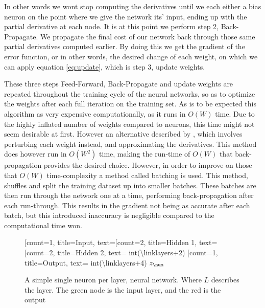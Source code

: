 In other words we wont stop computing the derivatives until we each either a
bias neuron on the point where we give the network its' input, ending up
with the partial derivative at each node. It is at this point we perform
step 2, Back-Propagate. We propagate the final cost of our network back 
through those same partial derivatives computed earlier. By doing this
we get the gradient of the error function, or in other words, the
desired change of each weight, on which we can apply equation \eqref{eq:update},
which is step 3, update weights.

These three steps Feed-Forward, Back-Propagate and update weights are repeated
throughout the training cycle of the neural networks, so as to optimize the
weights after each full iteration on the training set. As is to be expected
this algorithm as very expensive computationally, as it runs in $O(W)$ time.
Due to the highly inflated number of weights compared to neurons, this time
might not seem desirable at first. However an alternative described by
\cite{Bishop}, which involves perturbing each weight instead, and approximating
the derivatives. This method does however run in $O(W^2)$ time, making the
run-time of $O(W)$ that back-propagation provides the desired choice. However,
in order to improve on those that $O(W)$ time-complexity a method called
batching is used. This method, shuffles and split the training dataset up into
smaller batches. These batches are then run through the network one at a time,
performing back-propagation after each run-through. This results in the gradient
not being as accurate after each batch, but this introduced inaccuracy is
negligible compared to the computational time won.\cite{Bishop}

\begin{figure}
    \centering
\begin{neuralnetwork}[height=3]
  \newcommand{\nodetextx}[2]{\ifthenelse{\equal{#2}{0}}{$b_0$}{$x_{#2}$}}
  \newcommand{\nodetextz}[2]{\ifthenelse{\equal{#2}{0}}{$b_1$}{$z_{#2}$}}
  \newcommand{\nodetextzi}[2]{%
      \pgfmathsetmacro\num{int(#2+2)}%
      \ifthenelse{\equal{#2}{0}}{$b_2$}{$z_{\num}$}}
  \newcommand{\nodetextzii}[2]{%
      \pgfmathsetmacro\num{int(#2+4)}%
      {$z_{\num}$}}
  [count=1, title={Input}, text=\nodetextx]
  \hiddenlayer[count=2, title={Hidden 1}, text=\nodetextz]
  \linklayers
  \hiddenlayer[count=2, title={Hidden  2}, text=\nodetextzi]
  \linklayers
  \outputlayer[count=1, title={Output}, text=\nodetextzii] 
  \linklayers
\end{neuralnetwork}
    \caption{A simple single neuron per layer, neural network. Where $L$
        describes the layer. The green node is the input layer, and the red is
        the output}
    \label{fig:simple_NN}
\end{figure}


